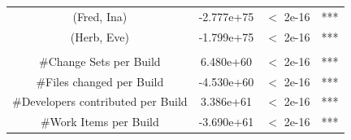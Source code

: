 \begin{table}[t!]
\begin{tabular}{cccc}
(Fred, Ina)  	&   -2.777e+75     & $<$ 2e-16 &***\\
(Herb, Eve)  	&   -1.799e+75     & $<$ 2e-16 &***\\
\\
\#Change Sets per Build     & \phantom{-}6.480e+60 &   $<$ 2e-16 &***\\
\#Files changed per Build            &-4.530e+60 &  $<$ 2e-16 &***\\
{\#Developers contributed per Build}  &   \phantom{-}3.386e+61 & $<$ 2e-16 &***\\
\#Work Items per Build    &  -3.690e+61   & $<$ 2e-16 &***\\
%
%
%

\end{tabular}
\end{table}
